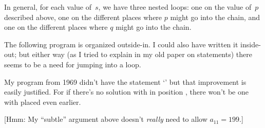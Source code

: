 In general, for each value of~$s$, we have three nested loops: one on
the value of~$p$ described above, one on the different places
where $p$ might go into the chain, and one on the different places
where $q$ might go into the chain.

The following program is organized outside-in. I could also have
written it inside-out; but either way (as I tried to explain in my old paper
on  statements) there seems to be a need for jumping
into a loop.

My program from 1969 didn't have the statement
`'
but that improvement is easily justified. For if there's no solution
with  in position , there won't be one with  placed
even earlier.

[Hmm: My ``subtle'' argument above doesn't {\it really\/} need to
allow $a_{11}=199$.]

